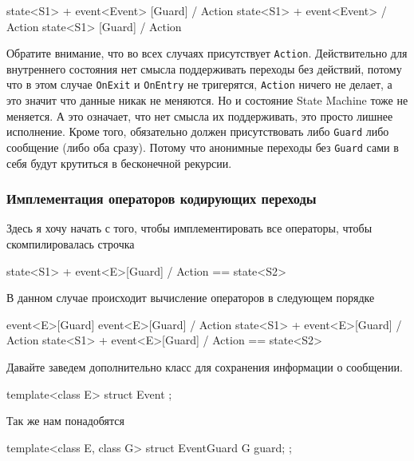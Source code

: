 \documentclass{article}
\begin{document}
{\begin{cppcode}[\nonumbers]
state<S1> + event<Event> [Guard] / Action
state<S1> + event<Event> / Action
state<S1> [Guard] / Action
\end{cppcode}
Обратите внимание, что во всех случаях присутствует \verb"Action".
Действительно для внутреннего состояния нет смысла поддерживать переходы без действий, потому что в этом случае \verb"OnExit" и \verb"OnEntry" не тригерятся, \verb"Action" ничего не делает, а это значит что данные никак не меняются.
Но и состояние State Machine тоже не меняется.
А это означает, что нет смысла их поддерживать, это просто лишнее исполнение.
Кроме того, обязательно должен присутствовать либо \verb"Guard" либо сообщение (либо оба сразу).
Потому что анонимные переходы без \verb"Guard" сами в себя будут крутиться в бесконечной рекурсии.

\subsubsection{Имплементация операторов кодирующих переходы}

Здесь я хочу начать с того, чтобы имплементировать все операторы, чтобы скомпилировалась строчка
\begin{cppcode}[\nonumbers]
state<S1> + event<E>[Guard] / Action == state<S2>
\end{cppcode}
В данном случае происходит вычисление операторов в следующем порядке
\begin{cppcode}[\nonumbers]
            event<E>[Guard]
            event<E>[Guard] / Action
state<S1> + event<E>[Guard] / Action
state<S1> + event<E>[Guard] / Action == state<S2>
\end{cppcode}
Давайте заведем дополнительно класс для сохранения  информации о сообщении.
\begin{cppcode}[\nonumbers]
template<class E>
struct Event {
};
\end{cppcode}
Так же нам понадобятся
\begin{cppcode}[\nonumbers]
template<class E, class G>
struct EventGuard {
  G guard;
};


\end{cppcode}}
\end{document}
